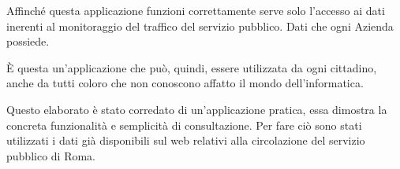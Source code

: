 Affinché questa applicazione funzioni correttamente serve solo l’accesso ai dati inerenti al monitoraggio del traffico del servizio pubblico. Dati che ogni Azienda possiede. 

È questa un’applicazione che può, quindi, essere utilizzata da ogni cittadino, anche da tutti coloro che non conoscono affatto il mondo dell’informatica.

Questo elaborato è stato corredato di un’applicazione pratica, essa dimostra la concreta funzionalità e semplicità di consultazione. Per fare ciò sono stati utilizzati i dati già disponibili sul web relativi alla circolazione del servizio pubblico di Roma.

\newpage
